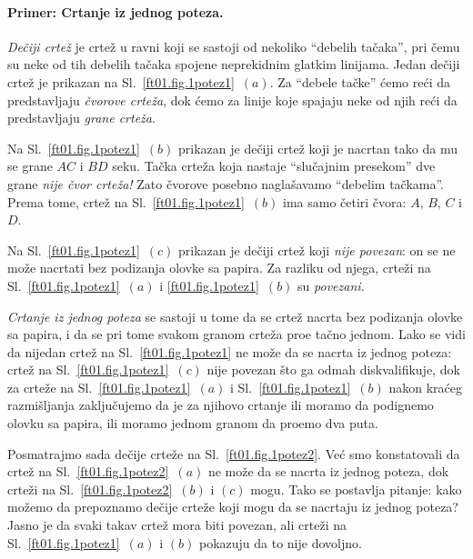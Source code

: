 \paragraph{Primer: Crtanje iz jednog poteza.}
\emph{De\v ciji crte\v z} je crte\v z u ravni koji se sastoji od nekoliko \enquote{debelih ta\v caka},
pri \v cemu su neke od tih debelih ta\v caka spojene neprekidnim glatkim linijama. Jedan de\v ciji
crte\v z je prikazan na Sl.~\ref{ft01.fig.1potez1}~$(a)$. Za \enquote{debele ta\v cke} \'cemo re\'ci da
predstavljaju \emph{\v cvorove crte\v za}, dok \'cemo za linije koje spajaju neke od njih re\'ci da
predstavljaju \emph{grane crte\v za}.

Na Sl.~\ref{ft01.fig.1potez1}~$(b)$ prikazan je de\v ciji crte\v z koji je nacrtan tako da mu se grane $AC$ i $BD$ seku.
Ta\v cka crte\v za koja nastaje \enquote{slu\v cajnim presekom} dve grane \emph{nije \v cvor crte\v za!}
Zato \v cvorove posebno nagla\v savamo \enquote{debelim ta\v ckama}. Prema tome, crte\v z na Sl.~\ref{ft01.fig.1potez1}~$(b)$
ima samo \v cetiri \v cvora: $A$, $B$, $C$ i $D$.

Na Sl.~\ref{ft01.fig.1potez1}~$(c)$ prikazan je de\v ciji crte\v z koji \emph{nije povezan}: on se
ne mo\v ze nacrtati bez podizanja olovke sa papira.
Za razliku od njega, crte\v zi na Sl.~\ref{ft01.fig.1potez1}~$(a)$ i \ref{ft01.fig.1potez1}~$(b)$ su \emph{povezani.}

\emph{Crtanje iz jednog poteza} se sastoji u tome da se crte\v z nacrta
bez podizanja olovke sa papira, i da se pri tome svakom granom crte\v za pro\dj e ta\v cno jednom.
Lako se vidi da nijedan crte\v z na Sl.~\ref{ft01.fig.1potez1} ne mo\v ze da se nacrta iz jednog poteza:
crte\v z na Sl.~\ref{ft01.fig.1potez1}~$(c)$ nije povezan \v sto ga odmah diskvalifikuje, dok za crte\v ze na
Sl.~\ref{ft01.fig.1potez1}~$(a)$ i Sl.~\ref{ft01.fig.1potez1}~$(b)$ nakon kra\'ceg razmi\v sljanja zaklju\v cujemo da je za njihovo crtanje
ili moramo da podignemo olovku sa papira, ili moramo jednom granom da pro\dj emo dva puta.

Posmatrajmo sada de\v cije crte\v ze na Sl.~\ref{ft01.fig.1potez2}. Ve\'c smo konstatovali da crte\v z na 
Sl.~\ref{ft01.fig.1potez2}~$(a)$ ne mo\v ze da se nacrta iz jednog poteza, dok crte\v zi na
Sl.~\ref{ft01.fig.1potez2}~$(b)$ i $(c)$ mogu. Tako se postavlja pitanje: kako mo\v zemo da prepoznamo
de\v cije crte\v ze koji mogu da se nacrtaju iz jednog poteza? Jasno je da svaki takav crte\v z mora biti povezan,
ali crte\v zi na Sl.~\ref{ft01.fig.1potez1}~$(a)$ i $(b)$ pokazuju da to nije dovoljno.

